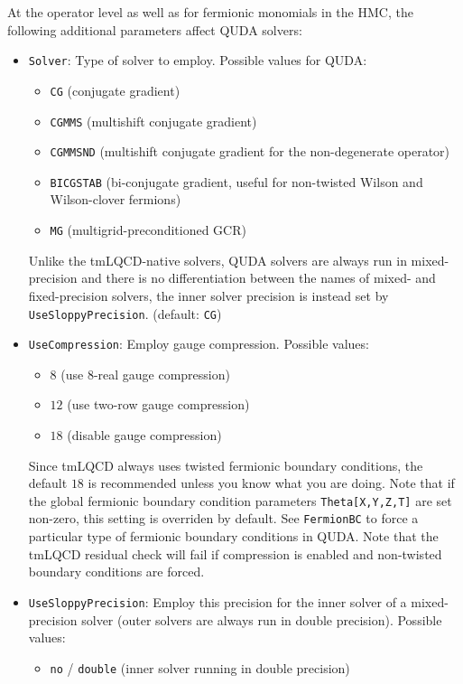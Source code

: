 At the operator level as well as for fermionic monomials in the HMC, the following additional parameters affect QUDA solvers:
\begin{itemize}
  \item \texttt{Solver}: Type of solver to employ. Possible values for QUDA:
    \begin{itemize}
      \item \texttt{CG} (conjugate gradient)
      \item \texttt{CGMMS} (multishift conjugate gradient)
      \item \texttt{CGMMSND} (multishift conjugate gradient for the non-degenerate operator)
      \item \texttt{BICGSTAB} (bi-conjugate gradient, useful for non-twisted Wilson and Wilson-clover fermions)
      \item \texttt{MG} (multigrid-preconditioned GCR)
    \end{itemize}
    Unlike the tmLQCD-native solvers, QUDA solvers are always run in mixed-precision and there is no differentiation between the names of mixed- and fixed-precision solvers, the inner solver precision is instead set by \texttt{UseSloppyPrecision}.
    (default: \texttt{CG})
  \item \texttt{UseCompression}: Employ gauge compression. Possible values: 
    \begin{itemize}
      \item $8$ (use 8-real gauge compression)
      \item $12$ (use two-row gauge compression)
      \item $18$ (disable gauge compression)
    \end{itemize}
    Since tmLQCD always uses twisted fermionic boundary conditions, the default $18$ is recommended unless you know what you are doing. Note that if the global fermionic boundary condition parameters \texttt{Theta[X,Y,Z,T]} are set non-zero, this setting is overriden by default. See \texttt{FermionBC} to force a particular type of fermionic boundary conditions in QUDA. Note that the tmLQCD residual check will fail if compression is enabled and non-twisted boundary conditions are forced.
  \item \texttt{UseSloppyPrecision}: Employ this precision for the inner solver of a mixed-precision solver (outer solvers are always run in double precision). Possible values:
    \begin{itemize}
      \item \texttt{no} / \texttt{double} (inner solver running in double precision)

\end{itemize}
\end{itemize}
